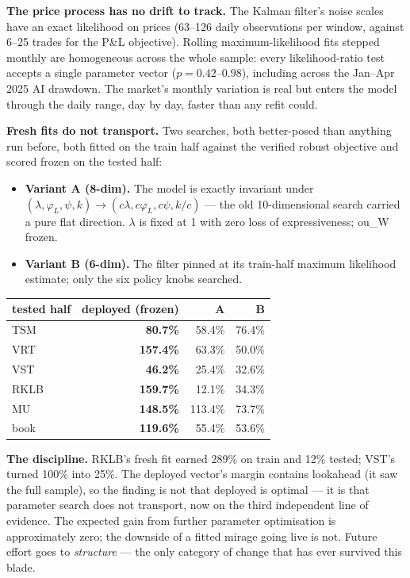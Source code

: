 \documentclass[11pt,a4paper]{article}
\begin{document}
\textbf{The price process has no drift to track.} The Kalman filter's noise scales
have an exact likelihood on prices (63--126 daily observations per window, against
6--25 trades for the P\&L objective). Rolling maximum-likelihood fits stepped
monthly are homogeneous across the whole sample: every likelihood-ratio test
accepts a single parameter vector ($p = 0.42$--$0.98$), including across the
Jan--Apr 2025 AI drawdown. The market's monthly variation is real but enters the
model through the daily range, day by day, faster than any refit could.

\textbf{Fresh fits do not transport.} Two searches, both better-posed than
anything run before, both fitted on the train half against the verified robust
objective and scored frozen on the tested half:

\begin{itemize}
  \item \textbf{Variant A (8-dim).} The model is exactly invariant under
        $(\lambda,\varphi_L,\psi,k)\to(c\lambda,c\varphi_L,c\psi,k/c)$ --- the old
        10-dimensional search carried a pure flat direction. $\lambda$ is fixed
        at 1 with zero loss of expressiveness; ou\_W frozen.
  \item \textbf{Variant B (6-dim).} The filter pinned at its train-half maximum
        likelihood estimate; only the six policy knobs searched.
\end{itemize}

\begin{center}
\begin{tabular}{lrrr}
\toprule
tested half & deployed (frozen) & A & B \\
\midrule
TSM  & \textbf{80.7\%} & 58.4\% & 76.4\% \\
VRT  & \textbf{157.4\%} & 63.3\% & 50.0\% \\
VST  & \textbf{46.2\%} & 25.4\% & 32.6\% \\
RKLB & \textbf{159.7\%} & 12.1\% & 34.3\% \\
MU   & \textbf{148.5\%} & 113.4\% & 73.7\% \\
\midrule
book & \textbf{119.6\%} & 55.4\% & 53.6\% \\
\bottomrule
\end{tabular}
\end{center}

\begin{tcolorbox}[colback=bcteal!6,colframe=bcteal,boxrule=0.8pt,arc=1.5pt,
  left=8pt,right=8pt,top=6pt,bottom=6pt]
\textbf{The discipline.} RKLB's fresh fit earned 289\% on train and 12\% tested;
VST's turned 100\% into 25\%. The deployed vector's margin contains lookahead (it
saw the full sample), so the finding is not that deployed is optimal --- it is that
parameter search does not transport, now on the third independent line of
evidence. The expected gain from further parameter optimisation is approximately
zero; the downside of a fitted mirage going live is not. Future effort goes to
\emph{structure} --- the only category of change that has ever survived this blade.
\end{tcolorbox}
\end{document}
